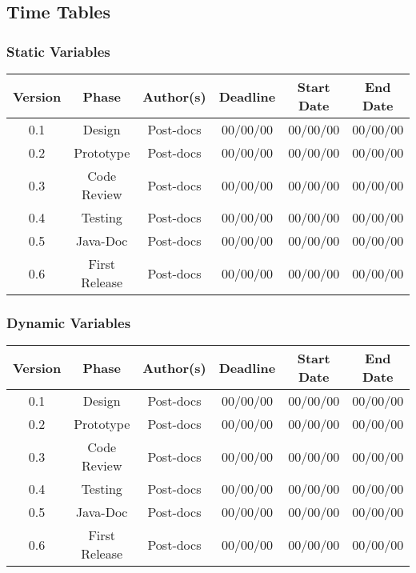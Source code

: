 \newpage
\subsection{Time Tables}

\subsubsection*{Static Variables}

\begin{table}[H]
\begin{tabular}{cccccc}
\hline
\textbf{Version} & \textbf{Phase} & \textbf{Author(s)} & \textbf{Deadline} & \textbf{Start Date} & \textbf{End Date}\\
\hline
0.1 & Design & Post-docs & 00/00/00 & 00/00/00 & 00/00/00\\
\hline 
0.2 & Prototype & Post-docs & 00/00/00 & 00/00/00 & 00/00/00\\
\hline 
0.3 & Code Review & Post-docs & 00/00/00 & 00/00/00 & 00/00/00\\
\hline 
0.4 & Testing & Post-docs & 00/00/00 & 00/00/00 & 00/00/00\\
\hline 
0.5 & Java-Doc  & Post-docs & 00/00/00 & 00/00/00 & 00/00/00\\
\hline 
0.6 & First Release & Post-docs & 00/00/00 & 00/00/00 & 00/00/00\\
\hline
\end{tabular}
\end{table}

\subsubsection*{Dynamic Variables}

\begin{table}[H]
\begin{tabular}{cccccc}
\hline
\textbf{Version} & \textbf{Phase} & \textbf{Author(s)} & \textbf{Deadline} & \textbf{Start Date} & \textbf{End Date}\\
\hline
0.1 & Design & Post-docs & 00/00/00 & 00/00/00 & 00/00/00\\
\hline 
0.2 & Prototype & Post-docs & 00/00/00 & 00/00/00 & 00/00/00\\
\hline 
0.3 & Code Review & Post-docs & 00/00/00 & 00/00/00 & 00/00/00\\
\hline 
0.4 & Testing & Post-docs & 00/00/00 & 00/00/00 & 00/00/00\\
\hline 
0.5 & Java-Doc  & Post-docs & 00/00/00 & 00/00/00 & 00/00/00\\
\hline 
0.6 & First Release & Post-docs & 00/00/00 & 00/00/00 & 00/00/00\\
\hline
\end{tabular}
\end{table}

